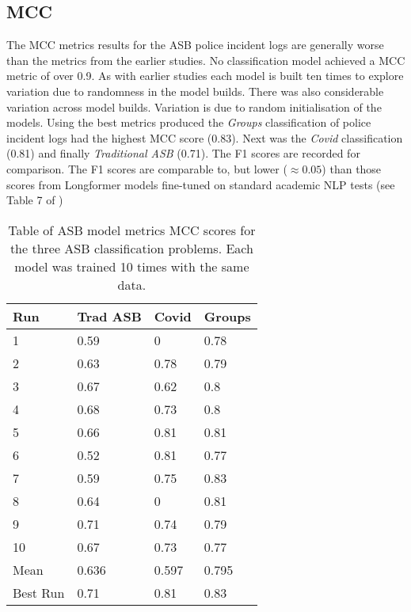 \subsection{MCC} The MCC metrics results for the ASB police incident logs are generally worse than the metrics from the earlier studies. No classification model achieved a MCC metric of over 0.9. As with earlier studies each model is built ten times to explore variation due to randomness in the model builds. There was also considerable variation across model builds. Variation is due to random initialisation of the models. Using the best metrics produced the \emph{Groups} classification of police incident logs had the highest MCC score (0.83). Next was the \emph{Covid} classification (0.81) and finally \emph{Traditional ASB} (0.71). The F1 scores are recorded for comparison. The F1 scores are comparable to, but lower ($\approx 0.05$) than those scores from Longformer models fine-tuned on standard academic NLP tests (see Table 7 of \textcite{beltagy2020longformer}) 

\begin{table}[h]
\centering
\begin{tabular}{@{}llll@{}}
\toprule
Run      & Trad ASB & Covid & Groups \\ \midrule
1        & 0.59     & 0     & 0.78   \\
2        & 0.63     & 0.78  & 0.79   \\
3        & 0.67     & 0.62  & 0.8    \\
4        & 0.68     & 0.73  & 0.8    \\
5        & 0.66     & 0.81  & 0.81   \\
6        & 0.52     & 0.81  & 0.77   \\
7        & 0.59     & 0.75  & 0.83   \\
8        & 0.64     & 0     & 0.81   \\
9        & 0.71     & 0.74  & 0.79   \\
10       & 0.67     & 0.73  & 0.77   \\
Mean     & 0.636    & 0.597 & 0.795  \\
Best Run & 0.71     & 0.81  & 0.83   \\ \bottomrule
\end{tabular}
    \caption[Table of ASB model metrics]{{Table of ASB model metrics} MCC scores for the three ASB classification problems. Each model was trained 10 times with the same data.}
    \label{tab: asb_metrics}
\end{table}

